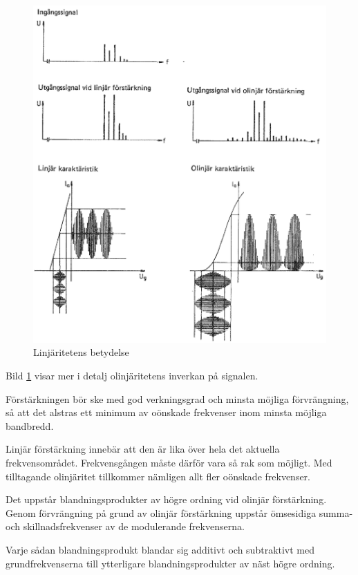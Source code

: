 \begin{figure}
\includegraphics[width=\textwidth]{images/cropped_pdfs/bild_2_3-54.pdf}
\caption{Linjäritetens betydelse}
\label{fig:BildII3-54}
\end{figure}

Bild \ref{fig:BildII3-54} visar mer i detalj olinjäritetens inverkan på
signalen.

Förstärkningen bör ske med god verkningsgrad och minsta möjliga förvrängning,
så att det alstras ett minimum av oönskade frekvenser inom minsta möjliga
bandbredd.

Linjär förstärkning innebär att den är lika över hela det aktuella
frekvensområdet.
Frekvensgången måste därför vara så rak som möjligt.
Med tilltagande olinjäritet tillkommer nämligen allt fler oönskade frekvenser.

Det uppstår blandningsprodukter av högre ordning vid olinjär förstärkning.
Genom förvrängning på grund av olinjär förstärkning uppstår ömsesidiga summa-
och skillnadsfrekvenser av de modulerande frekvenserna.

Varje sådan blandningsprodukt blandar sig additivt och subtraktivt med
grundfrekvenserna till ytterligare blandningsprodukter av näst högre ordning.

